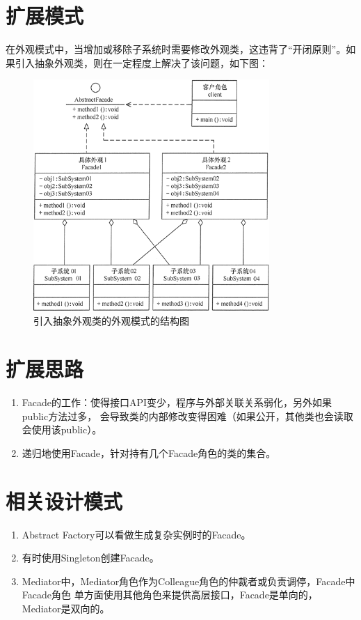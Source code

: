 \section{扩展模式}
在外观模式中，当增加或移除子系统时需要修改外观类，这违背了“开闭原则”。如果引入抽象外观类，则在一定程度上解决了该问题，如下图：
\begin{figure}[!h]
	\centering
	\includegraphics[width=0.8\textwidth]{image/15-2}
	\caption{引入抽象外观类的外观模式的结构图}
\end{figure}
\section{扩展思路}
\begin{enumerate}
	\item Facade的工作：使得接口API变少，程序与外部关联关系弱化，另外如果public方法过多，
	会导致类的内部修改变得困难（如果公开，其他类也会读取会使用该public）。
	\item 递归地使用Facade，针对持有几个Facade角色的类的集合。
\end{enumerate}
\section{相关设计模式}
\begin{enumerate}
	\item Abstract Factory可以看做生成复杂实例时的Facade。
	\item 有时使用Singleton创建Facade。
	\item Mediator中，Mediator角色作为Colleague角色的仲裁者或负责调停，Facade中Facade角色
	单方面使用其他角色来提供高层接口，Facade是单向的，Mediator是双向的。
\end{enumerate}
